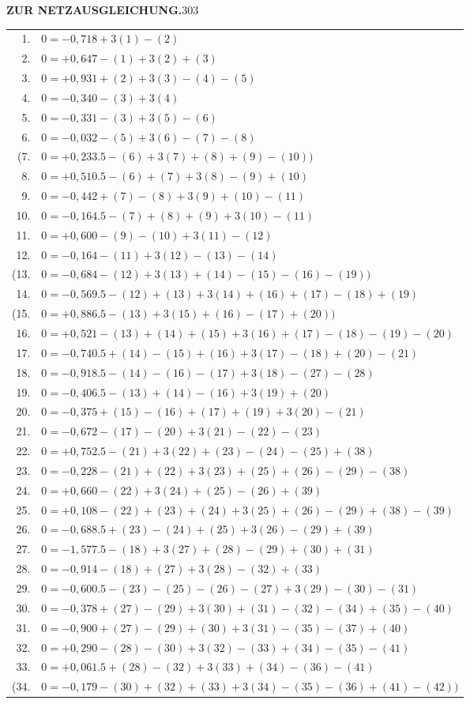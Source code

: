 \newpage
\noindent\textbf{ZUR NETZAUSGLEICHUNG.}\hfill303
\begingroup
\renewcommand{\arraystretch}{1.16}
\begin{longtable}{@{}r@{\quad}l@{}}
1.&$0=-0{,}718+3(1)-(2)$\\
2.&$0=+0{,}647-(1)+3(2)+(3)$\\
3.&$0=+0{,}931+(2)+3(3)-(4)-(5)$\\
4.&$0=-0{,}340-(3)+3(4)$\\
5.&$0=-0{,}331-(3)+3(5)-(6)$\\
6.&$0=-0{,}032-(5)+3(6)-(7)-(8)$\\
(7.&$0=+0{,}233.5-(6)+3(7)+(8)+(9)-(10))$\\
8.&$0=+0{,}510.5-(6)+(7)+3(8)-(9)+(10)$\\
9.&$0=-0{,}442+(7)-(8)+3(9)+(10)-(11)$\\
10.&$0=-0{,}164.5-(7)+(8)+(9)+3(10)-(11)$\\
11.&$0=+0{,}600-(9)-(10)+3(11)-(12)$\\
12.&$0=-0{,}164-(11)+3(12)-(13)-(14)$\\
(13.&$0=-0{,}684-(12)+3(13)+(14)-(15)-(16)-(19))$\\
14.&$0=-0{,}569.5-(12)+(13)+3(14)+(16)+(17)-(18)+(19)$\\
(15.&$0=+0{,}886.5-(13)+3(15)+(16)-(17)+(20))$\\
16.&$0=+0{,}521-(13)+(14)+(15)+3(16)+(17)-(18)-(19)-(20)$\\
17.&$0=-0{,}740.5+(14)-(15)+(16)+3(17)-(18)+(20)-(21)$\\
18.&$0=-0{,}918.5-(14)-(16)-(17)+3(18)-(27)-(28)$\\
19.&$0=-0{,}406.5-(13)+(14)-(16)+3(19)+(20)$\\
20.&$0=-0{,}375+(15)-(16)+(17)+(19)+3(20)-(21)$\\
21.&$0=-0{,}672-(17)-(20)+3(21)-(22)-(23)$\\
22.&$0=+0{,}752.5-(21)+3(22)+(23)-(24)-(25)+(38)$\\
23.&$0=-0{,}228-(21)+(22)+3(23)+(25)+(26)-(29)-(38)$\\
24.&$0=+0{,}660-(22)+3(24)+(25)-(26)+(39)$\\
25.&$0=+0{,}108-(22)+(23)+(24)+3(25)+(26)-(29)+(38)-(39)$\\
26.&$0=-0{,}688.5+(23)-(24)+(25)+3(26)-(29)+(39)$\\
27.&$0=-1{,}577.5-(18)+3(27)+(28)-(29)+(30)+(31)$\\
28.&$0=-0{,}914-(18)+(27)+3(28)-(32)+(33)$\\
29.&$0=-0{,}600.5-(23)-(25)-(26)-(27)+3(29)-(30)-(31)$\\
30.&$0=-0{,}378+(27)-(29)+3(30)+(31)-(32)-(34)+(35)-(40)$\\
31.&$0=-0{,}900+(27)-(29)+(30)+3(31)-(35)-(37)+(40)$\\
32.&$0=+0{,}290-(28)-(30)+3(32)-(33)+(34)-(35)-(41)$\\
33.&$0=+0{,}061.5+(28)-(32)+3(33)+(34)-(36)-(41)$\\
(34.&$0=-0{,}179-(30)+(32)+(33)+3(34)-(35)-(36)+(41)-(42))$\\
\end{longtable}
